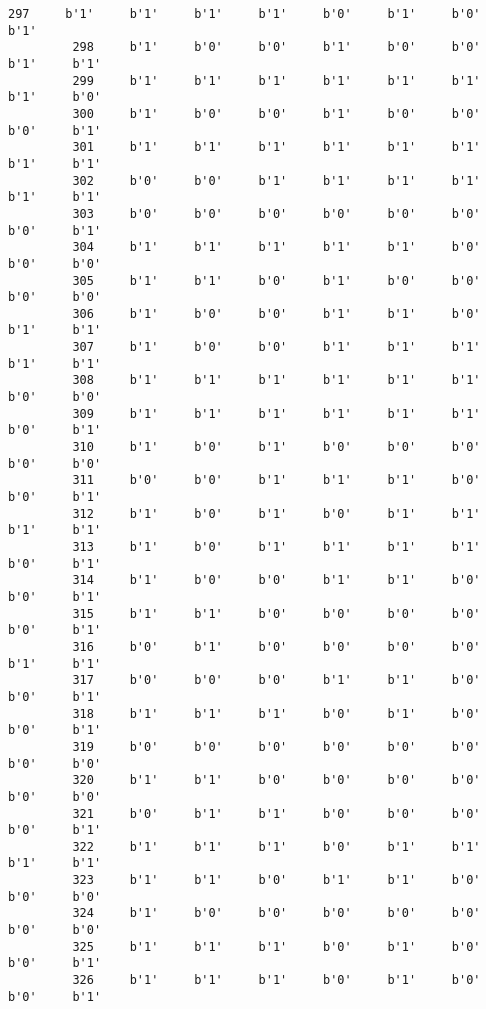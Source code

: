 \documentclass[11pt]{article}
\begin{document}
\begin{Verbatim}[commandchars=\\\{\}]
         297     b'1'     b'1'     b'1'     b'1'     b'0'     b'1'     b'0'     b'1'   
         298     b'1'     b'0'     b'0'     b'1'     b'0'     b'0'     b'1'     b'1'   
         299     b'1'     b'1'     b'1'     b'1'     b'1'     b'1'     b'1'     b'0'   
         300     b'1'     b'0'     b'0'     b'1'     b'0'     b'0'     b'0'     b'1'   
         301     b'1'     b'1'     b'1'     b'1'     b'1'     b'1'     b'1'     b'1'   
         302     b'0'     b'0'     b'1'     b'1'     b'1'     b'1'     b'1'     b'1'   
         303     b'0'     b'0'     b'0'     b'0'     b'0'     b'0'     b'0'     b'1'   
         304     b'1'     b'1'     b'1'     b'1'     b'1'     b'0'     b'0'     b'0'   
         305     b'1'     b'1'     b'0'     b'1'     b'0'     b'0'     b'0'     b'0'   
         306     b'1'     b'0'     b'0'     b'1'     b'1'     b'0'     b'1'     b'1'   
         307     b'1'     b'0'     b'0'     b'1'     b'1'     b'1'     b'1'     b'1'   
         308     b'1'     b'1'     b'1'     b'1'     b'1'     b'1'     b'0'     b'0'   
         309     b'1'     b'1'     b'1'     b'1'     b'1'     b'1'     b'0'     b'1'   
         310     b'1'     b'0'     b'1'     b'0'     b'0'     b'0'     b'0'     b'0'   
         311     b'0'     b'0'     b'1'     b'1'     b'1'     b'0'     b'0'     b'1'   
         312     b'1'     b'0'     b'1'     b'0'     b'1'     b'1'     b'1'     b'1'   
         313     b'1'     b'0'     b'1'     b'1'     b'1'     b'1'     b'0'     b'1'   
         314     b'1'     b'0'     b'0'     b'1'     b'1'     b'0'     b'0'     b'1'   
         315     b'1'     b'1'     b'0'     b'0'     b'0'     b'0'     b'0'     b'1'   
         316     b'0'     b'1'     b'0'     b'0'     b'0'     b'0'     b'1'     b'1'   
         317     b'0'     b'0'     b'0'     b'1'     b'1'     b'0'     b'0'     b'1'   
         318     b'1'     b'1'     b'1'     b'0'     b'1'     b'0'     b'0'     b'1'   
         319     b'0'     b'0'     b'0'     b'0'     b'0'     b'0'     b'0'     b'0'   
         320     b'1'     b'1'     b'0'     b'0'     b'0'     b'0'     b'0'     b'0'   
         321     b'0'     b'1'     b'1'     b'0'     b'0'     b'0'     b'0'     b'1'   
         322     b'1'     b'1'     b'1'     b'0'     b'1'     b'1'     b'1'     b'1'   
         323     b'1'     b'1'     b'0'     b'1'     b'1'     b'0'     b'0'     b'0'   
         324     b'1'     b'0'     b'0'     b'0'     b'0'     b'0'     b'0'     b'0'   
         325     b'1'     b'1'     b'1'     b'0'     b'1'     b'0'     b'0'     b'1'   
         326     b'1'     b'1'     b'1'     b'0'     b'1'     b'0'     b'0'     b'1'   

\end{Verbatim}
\end{document}
